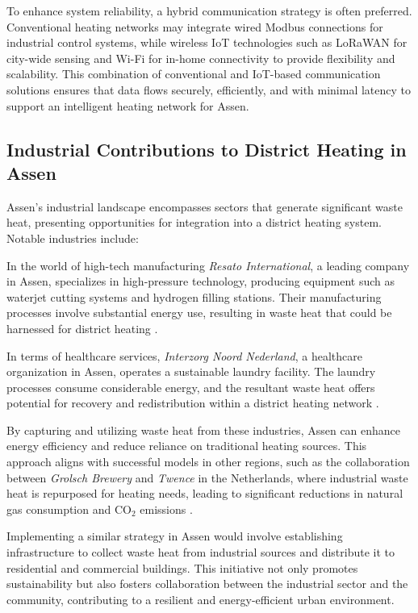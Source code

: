 \documentclass{article}
\begin{document}
To enhance system reliability, a hybrid communication strategy is often preferred. Conventional heating networks may integrate wired Modbus connections for industrial control systems, while wireless IoT technologies such as LoRaWAN for city-wide sensing and Wi-Fi for in-home connectivity to provide flexibility and scalability. This combination of conventional and IoT-based communication solutions ensures that data flows securely, efficiently, and with minimal latency to support an intelligent heating network for Assen.

\subsection{Industrial Contributions to District Heating in Assen}

Assen's industrial landscape encompasses sectors that generate significant waste heat, presenting opportunities for integration into a district heating system. Notable industries include:

In the world of high-tech manufacturing \textit{Resato International}, a leading company in Assen, specializes in high-pressure technology, producing equipment such as waterjet cutting systems and hydrogen filling stations. Their manufacturing processes involve substantial energy use, resulting in waste heat that could be harnessed for district heating \cite{resato_sustainability}.

In terms of healthcare services, \textit{Interzorg Noord Nederland}, a healthcare organization in Assen, operates a sustainable laundry facility. The laundry processes consume considerable energy, and the resultant waste heat offers potential for recovery and redistribution within a district heating network \cite{interzorg_laundry}.

By capturing and utilizing waste heat from these industries, Assen can enhance energy efficiency and reduce reliance on traditional heating sources. This approach aligns with successful models in other regions, such as the collaboration between \textit{Grolsch Brewery} and \textit{Twence} in the Netherlands, where industrial waste heat is repurposed for heating needs, leading to significant reductions in natural gas consumption and CO$_2$ emissions \cite{grolsch_twence}.

Implementing a similar strategy in Assen would involve establishing infrastructure to collect waste heat from industrial sources and distribute it to residential and commercial buildings. This initiative not only promotes sustainability but also fosters collaboration between the industrial sector and the community, contributing to a resilient and energy-efficient urban environment.
\end{document}

